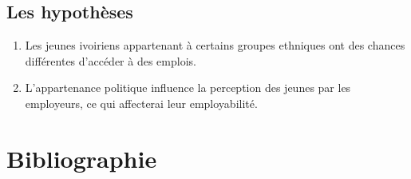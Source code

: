 \documentclass[12pt,a4paper, openany]{book}
\begin{document}
\section{Les hypothèses}
\begin{enumerate}[label=\arabic*)]
	\item Les jeunes ivoiriens appartenant à certains groupes ethniques ont des chances différentes d'accéder à des emplois.
	\item L'appartenance politique influence la perception des jeunes par les employeurs, ce qui affecterai leur employabilité.  
\end{enumerate}\newpage

	\chapter*{Bibliographie}
	\nocite{*}
	\printbibliography[type=article, title=Articles]
	\printbibliography[type=book, title=Livres]
	\printbibliography[type=misc, title=Liens internet]
	



	
	\tableofcontents
	
\end{document}
